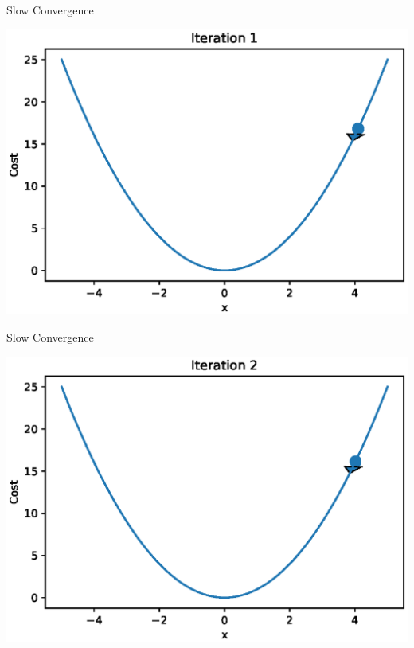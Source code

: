 \documentclass{beamer}
\begin{document}
\begin{frame}{Slow Convergence}
  \begin{center}
       \includegraphics[totalheight=6cm]{gradient-descent/undershooting-1.eps}
   \end{center}
\end{frame}

\begin{frame}{Slow Convergence}
  \begin{center}
       \includegraphics[totalheight=6cm]{gradient-descent/undershooting-2.eps}
   \end{center}
\end{frame}
\end{document}
